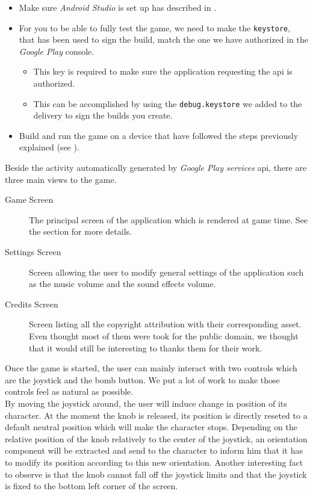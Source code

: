 \begin{itemize}
	\item Make sure \textit{Android Studio} is set up has described in .
	\item For you to be able to fully test the game, we need to make the \texttt{keystore}, that has been used to sign the build, match the one we have authorized in the \textit{Google Play} console.
	\begin{itemize}
		\item This key is required to make sure the application requesting the \gls{api} is authorized.
		\item This can be accomplished by using the \texttt{debug.keystore} we added to the delivery to sign the builds you create.
	\end{itemize}
	\item Build and run the game on a device that have followed the steps previously explained (see ).
\end{itemize}

Beside the activity automatically generated by \textit{Google Play services} \gls{api}, there are three main views to the game.
\begin{description}
	\item [Game Screen] The principal screen of the application which is rendered at game time. See the section  for more details.
	\item [Settings Screen] Screen allowing the user to modify general settings of the application such as the music volume and the sound effects volume.
	\item [Credits Screen] Screen listing all the copyright attribution with their corresponding asset. Even thought most of them were took for the public domain, we thought that it would still be interesting to thanks them for their work.
\end{description}

Once the game is started, the user can mainly interact with two controls which are the joystick and the bomb button. We put a lot of work to make those controls feel as natural as possible. \\

By moving the joystick around, the user will induce change in position of its character. At the moment the knob is released, its position is directly reseted to a default neutral position which will make the character stops. Depending on the relative position of the knob relatively to the center of the joystick, an orientation component will be extracted and send to the character to inform him that it has to modify its position according to this new orientation. Another interesting fact to observe is that the knob cannot fall off the joystick limits and that the joystick is fixed to the bottom left corner of the screen. \\

